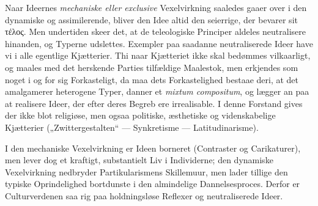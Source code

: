 \documentclass[12pt]{book}
\begin{document}
Naar Ideernes \emph{mechaniske eller exclusive} Vexelvirkning saaledes gaaer over i den
dynamiske og assimilerende, bliver den Idee altid den seierrige, der bevarer sit τέλος.
Men undertiden skeer det, at de teleologiske Principer aldeles neutralisere hinanden, og
Typerne udslettes. Exempler paa saadanne neutraliserede Ideer have vi i alle egentlige
Kjætterier. Thi naar Kjætteriet ikke skal bedømmes vilkaarligt, og maales med det
herskende Parties tilfældige Maalestok, men erkjendes som noget i og for sig
Forkasteligt, da maa dets Forkastelighed bestaae deri, at det amalgamerer heterogene
Typer, danner et \textit{mixtum compositum}, og lægger an paa at realisere Ideer, der
efter deres Begreb ere irrealisable. I denne Forstand gives der ikke blot religiøse, men
ogsaa politiske, æsthetiske og videnskabelige Kjætterier („Zwittergestalten“ ---
Synkretisme --- Latitudinarisme).

I den mechaniske Vexelvirkning er Ideen borneret (Contraster og Carikaturer), men lever
dog et kraftigt, substantielt Liv i Individerne; den dynamiske Vexelvirkning nedbryder
Partikularismens Skillemuur, men lader tillige den typiske Oprindelighed bortdunste i den
almindelige Dannelsesproces. Derfor er Culturverdenen saa rig paa holdningsløse Reflexer
og neutraliserede Ideer.
\end{document}
